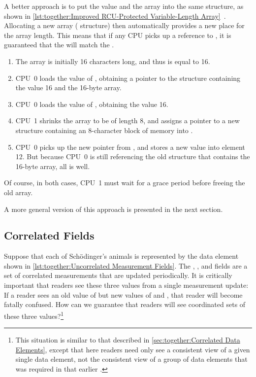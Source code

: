 A better approach is to put the value and the array into the same structure,
as shown in
\cref{lst:together:Improved RCU-Protected Variable-Length Array}~\cite{Arcangeli03}.
Allocating a new array ( structure) then automatically provides
a new place for the array length.
This means that if any CPU picks up a reference to , it is
guaranteed that the  will match the .

\begin{enumerate}
\item	The array is initially 16 characters long, and thus 
	is equal to 16.
\item	CPU~0 loads the value of , obtaining a pointer to
	the structure containing the value 16 and the 16-byte array.
\item	CPU~0 loads the value of , obtaining the value 16.
\item	CPU~1 shrinks the array to be of length 8, and assigns a pointer
	to a new  structure containing an 8-character block
	of memory into .
\item	CPU~0 picks up the new pointer from , and stores a
	new value into element 12.
	But because CPU~0 is still referencing the old 
	structure that contains the 16-byte array, all is well.
\end{enumerate}

Of course, in both cases, CPU~1 must wait for a grace period before
freeing the old array.

A more general version of this approach is presented in the next section.

\subsection{Correlated Fields}
\label{sec:together:Correlated Fields}

Suppose that each of Sch\"odinger's animals is represented by the
data element shown in
\cref{lst:together:Uncorrelated Measurement Fields}.
The , , and  fields are a set
of correlated measurements that are updated periodically.
It is critically important that readers see these three values from
a single measurement update:
If a reader sees an old value of  but new values of
 and , that reader will become fatally confused.
How can we guarantee that readers will see coordinated sets of these
three values?\footnote{
	This situation is similar to that described in
	\cref{sec:together:Correlated Data Elements},
	except that here readers need only see a consistent view of a
	given single data element, not the consistent view of a
	group of data elements that was required in that earlier
	.}

